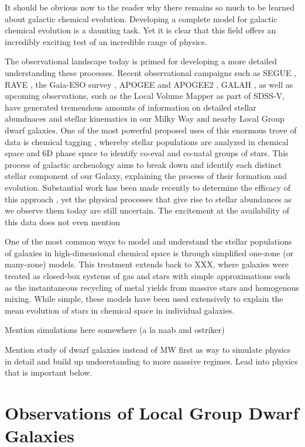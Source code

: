 It should be obvious now to the reader why there remains so much to be learned about galactic chemical evolution. Developing a complete model for galactic chemical evolution is a daunting task. Yet it is clear that this field offers an incredibly exciting test of an incredible range of physics.

The observational landscape today is primed for developing a more detailed understanding these processes. Recent observational campaigns such as SEGUE \citep{Yanny2009}, RAVE \citep{Kunder2017}, the Gaia-ESO survey \citep{Gaia}, APOGEE and APOGEE2 \citep{APOGEE2010,APOGEE}, GALAH \citep{GALAH,Buder2018}, as well as upcoming observations, such as the Local Volume Mapper as part of SDSS-V, have generated tremendous amounts of information on detailed stellar abundnaces and stellar kinematics in our Milky Way and nearby Local Group dwarf galaxies. One of the most powerful proposed uses of this enormous trove of data is chemical tagging \citep{Freeman2002}, whereby stellar populations are analyzed in chemical space and 6D phase space to identify co-eval and co-natal groups of stars. This process of galactic archeaology aims to break down and identify each distinct stellar component of our Galaxy, explaining the process of their formation and evolution. Substantial work has been made recently to determine the efficacy of this approach \citep[e.g.][]{Armillotta2018}, yet the physical processes that give rise to stellar abundances as we observe them today are still uncertain. The excitement at the availability of this data does not even mention 

One of the most common ways to model and understand the stellar populations of galaxies in high-dimensional chemical space is through simplified one-zone (or many-zone) models. This treatment extends back to XXX, where galaxies were treated as closed-box systems of gas and stars with simple approximations such as the instantaneous recycling of metal yields from massive stars and homogenous mixing. While simple, these models have been used extensively to explain the mean evolution of stars in chemical space in individual galaxies. 


Mention simulations here somewhere (a la naab and ostriker)


Mention study of dwarf galaxies instead of MW first as way to simulate physics in detail and build up undserstanding to more massive regimes. Lead into physics that is important below.


\section{Observations of Local Group Dwarf Galaxies}



